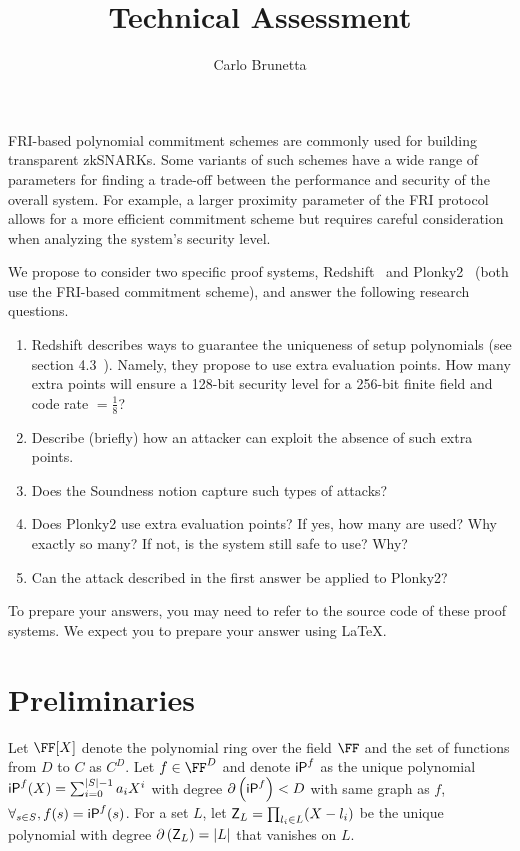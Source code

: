 \documentclass[a4paper,10pt]{article}
\author{Carlo Brunetta}
\title{Technical Assessment}
\begin{document}
	\maketitle

	FRI-based polynomial commitment schemes are commonly used for building transparent zkSNARKs.
	Some variants of such schemes have a wide range of parameters for finding a trade-off between
	the performance and security of the overall system.
	For example, a larger proximity parameter of the FRI protocol allows for a more efficient
	commitment scheme but requires careful consideration when analyzing the system's security level.

	We propose to consider two specific proof systems, Redshift~\cite{EPRINT:KPV19} and
	Plonky2~\cite{Plonky2} (both use the FRI-based commitment scheme), and answer the following
	research questions.

	\begin{enumerate}

		\item Redshift describes ways to guarantee the uniqueness of setup polynomials
			(see section 4.3~\cite{EPRINT:KPV19}).
			Namely, they propose to use extra evaluation points. How many extra points will ensure a
			128-bit security level for a 256-bit finite field and code rate $= \frac{1}{8}$?
		
		\item Describe (briefly) how an attacker can exploit the absence of such extra points.
		
		\item Does the Soundness notion capture such types of attacks?
		
		\item Does Plonky2 use extra evaluation points? If yes, how many are used? Why exactly so many?
			If not, is the system still safe to use? Why?
		
		\item Can the attack described in the first answer be applied to Plonky2?
	\end{enumerate}

	To prepare your answers, you may need to refer to the source code of these proof systems.
	We expect you to prepare your answer using \LaTeX.


	\section{Preliminaries}

		Let $\FF[X]$ denote the polynomial ring over the field $\FF$ and the set of functions from $D$ to $C$
		as $C^D$.
		Let $f \in \FF^D$ and denote $\textsf{iP}^{f}$ as the unique polynomial
		$\textsf{iP}^{f}(X) = \sum_{i=0}^{\left\lvert S \right\rvert-1} a_i X^i$ with degree
		$\partial\left({\textsf{iP}^{f}}\right) < D$ with same graph as $f$, \ie\
		$\forall_{s \in S}, f(s) = \textsf{iP}^{f}(s)$.
		For a set $L$, let $\textsf{Z}_{L} = \prod_{l_i \in L} (X-l_i)$ be the unique polynomial with
		degree $\partial\left({\textsf{Z}_{L}}\right) = \left\lvert L \right\rvert$ that vanishes on $L$.
\end{document}
